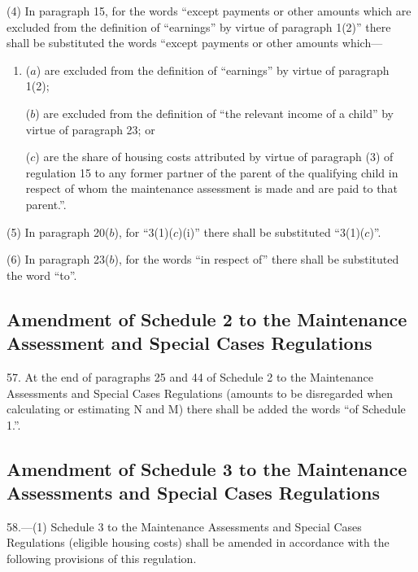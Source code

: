 \documentclass[12pt,a4paper]{article}
\begin{document}
(4) In paragraph 15, for the words “except payments or other amounts which are excluded from the definition of “earnings” by virtue of paragraph 1(2)” there shall be substituted the words
“except payments or other amounts which—
\begin{enumerate}\item[]
($a$) are excluded from the definition of “earnings” by virtue of paragraph 1(2);

($b$) are excluded from the definition of “the relevant income of a child” by virtue of paragraph 23; or

($c$) are the share of housing costs attributed by virtue of paragraph (3) of regulation 15 to any former partner of the parent of the qualifying child in respect of whom the maintenance assessment is made and are paid to that parent.”.
\end{enumerate}

(5) In paragraph 20($b$), for “3(1)($c$)(i)” there shall be substituted “3(1)($c$)”.

(6) In paragraph 23($b$), for the words “in respect of” there shall be substituted the word “to”.

\subsection[57. Amendment of Schedule 2 to the Maintenance Assessment and Special Cases Regulations]{Amendment of Schedule 2 to the Maintenance Assessment and Special Cases Regulations}

57.  At the end of paragraphs 25 and 44 of Schedule 2 to the Maintenance Assessments and Special Cases Regulations (amounts to be disregarded when calculating or estimating N and M) there shall be added the words “of Schedule 1.”.

\subsection[58. Amendment of Schedule 3 to the Maintenance Assessments and Special Cases Regulations]{Amendment of Schedule 3 to the Maintenance Assessments and Special Cases Regulations}

58.—(1) Schedule 3 to the Maintenance Assessments and Special Cases Regulations (eligible housing costs) shall be amended in accordance with the following provisions of this regulation.
\end{document}
